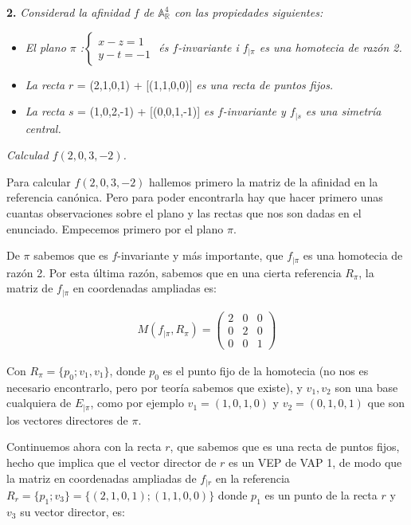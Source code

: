 \textbf{2. } \textit{Considerad la afinidad $f$ de $\mathbb{A}^{4}_\mathbb{R}$ con las propiedades siguientes:}
\begin{itemize}[-]
    \item \textit{El plano $\pi$ :}$ \begin{cases}
     x - z = 1\\ 
     y - t = -1
    \end{cases}$ \textit{és $f$-invariante i $f_{\mid\pi}$ es una homotecia de razón 2.}
    \item \textit{La recta }$r$ = (2,1,0,1) + [(1,1,0,0)] \textit{es una recta de puntos fijos.}
    \item \textit{La recta }$s$ = (1,0,2,-1) + [(0,0,1,-1)] \textit{es $f$-invariante y $f_{\mid s}$ es una simetría central.}
\end{itemize}
\vspace{5mm}
\textit{Calculad $f(2,0,3,-2)$.}

Para calcular $f(2,0,3,-2)$ hallemos primero la matriz de la afinidad en la referencia canónica. Pero para poder encontrarla hay que hacer primero unas cuantas observaciones sobre el plano y las rectas que nos son dadas en el enunciado. Empecemos primero por el plano $\pi$.

De $\pi$ sabemos que es $f$-invariante y más importante, que  $f_{\mid\pi}$ es una homotecia de razón 2. Por esta última razón, sabemos que en una cierta referencia $R_\pi$, la matriz de  $f_{\mid\pi}$ en coordenadas ampliadas es:

\begin{gather*}
    M(f_{\mid\pi}, R_\pi) = 
    \begin{pmatrix}
    2 & 0 & 0\\
    0 & 2 & 0\\
    0 & 0 & 1
    \end{pmatrix}
\end{gather*}

Con $R_\pi = \{p_0; v_1, v_1\}$, donde $p_0$ es el punto fijo de la homotecia (no nos es necesario encontrarlo, pero por teoría sabemos que existe), y $v_1,v_2$ son una base cualquiera de $E_{\mid\pi}$, como por ejemplo $v_1=(1,0,1,0)$ y $v_2=(0,1,0,1)$ que son los vectores directores de $\pi$.

Continuemos ahora con la recta $r$, que sabemos que es una recta de puntos fijos, hecho que implica que el vector director de $r$ es un VEP de VAP 1, de modo que la matriz en coordenadas ampliadas de $f_{\mid r}$ en la referencia $R_r = \{p_1; v_3\} = \{(2,1,0,1); (1,1,0,0)\}$ donde $p_1$ es un punto de la recta $r$ y $v_3$ su vector director, es:


